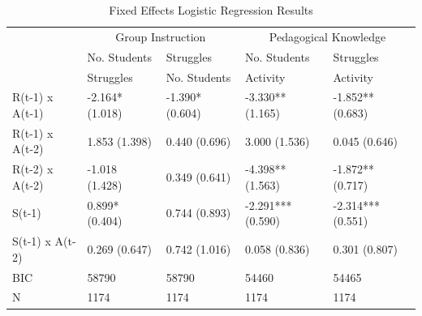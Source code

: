\documentclass[
  number,
  preprint,
  3p,
  onecolumn]{elsarticle}
\begin{document}
\begin{longtable}{l|llll}

\caption{\label{tbl-fe-results-full}State-Based Panel Logistic
Regression Results}

\tabularnewline

\caption*{
{\large Fixed Effects Logistic Regression Results}
} \\ 
\toprule
\multicolumn{1}{l}{} & \multicolumn{2}{c}{Group Instruction} & \multicolumn{2}{c}{Pedagogical Knowledge} \\ 
\cmidrule(lr){2-3} \cmidrule(lr){4-5}
\multicolumn{1}{l}{} & No. Students & Struggles & No. Students & Struggles \\ 
\cmidrule(lr){2-2} \cmidrule(lr){3-3} \cmidrule(lr){4-4} \cmidrule(lr){5-5}
\multicolumn{1}{l}{} & Struggles & No. Students & Activity & Activity \\ 
\midrule\addlinespace[2.5pt]
R(t-1) x 
 A(t-1) & -2.164*
(1.018) & -1.390*
(0.604) & -3.330**
(1.165) & -1.852**
(0.683) \\ 
R(t-1) x 
 A(t-2) & 1.853
(1.398) & 0.440
(0.696) & 3.000
(1.536) & 0.045
(0.646) \\ 
R(t-2) x 
 A(t-2) & -1.018
(1.428) & 0.349
(0.641) & -4.398**
(1.563) & -1.872**
(0.717) \\ 
S(t-1) & 0.899*
(0.404) & 0.744
(0.893) & -2.291***
(0.590) & -2.314***
(0.551) \\ 
S(t-1) x 
 A(t-2) & 0.269
(0.647) & 0.742
(1.016) & 0.058
(0.836) & 0.301
(0.807) \\ 
BIC & 58790 & 58790 & 54460 & 54465 \\ 
N & 1174 & 1174 & 1174 & 1174 \\ 
\bottomrule

\end{longtable}
\end{document}
